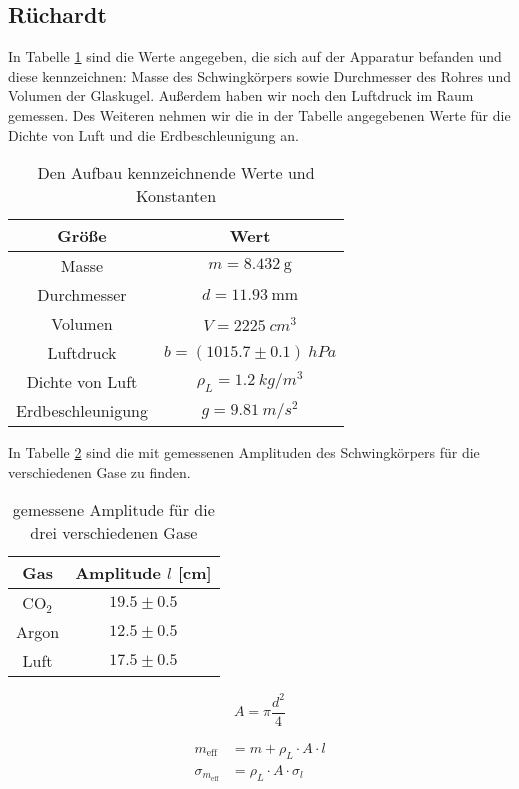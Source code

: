 \documentclass[12pt,a4paper,titlepage,headinclude,bibtotoc]{scrartcl}
\begin{document}
\subsection{Rüchardt}
In Tabelle \ref{tab:RuechardtWerte} sind die Werte angegeben, die sich auf der Apparatur befanden und diese kennzeichnen: Masse des Schwingkörpers sowie Durchmesser des Rohres und Volumen der Glaskugel.
Außerdem haben wir noch den Luftdruck im Raum gemessen.
Des Weiteren nehmen wir die in der Tabelle angegebenen Werte für die Dichte von Luft und die Erdbeschleunigung an.
\begin{table}[!htb]
	\centering
	\begin{tabular}{|c|c|}
		\hline
		Größe & Wert\\
		\hline
		\hline
		Masse & $m = 8.432~\si{\gram}$\\
		Durchmesser & $d = 11.93~\si{\milli\meter}$\\
		Volumen & $V = 2225~\si{cm^3}$\\
		\hline
		Luftdruck & $b = (1015.7 \pm 0.1)~\si{hPa}$\\ 		
		\hline
		Dichte von Luft & $\rho_L = 1.2~\si{kg/m^3}$\\
		Erdbeschleunigung & $g = 9.81~\si{m/s^2}$\\		
		\hline
	\end{tabular}
	\caption{Den Aufbau kennzeichnende Werte und Konstanten}
	\label{tab:RuechardtWerte}	
\end{table}
In Tabelle \ref{tab:RuechardtAmpl} sind die mit gemessenen Amplituden des Schwingkörpers für die verschiedenen Gase zu finden.
\begin{table}[!hbt]
	\centering
	\begin{tabular}{|c|c|}
		\hline
		Gas & Amplitude $l$ [cm]\\
		\hline
		\hline
		CO$_2$& $19.5\pm0.5$\\
		Argon & $12.5\pm0.5$\\
		Luft & $17.5\pm0.5$\\
		\hline
	\end{tabular}
	\caption{gemessene Amplitude für die drei verschiedenen Gase}
	\label{tab:RuechardtAmpl}
\end{table}

$$ A = \pi\frac{d^2}{4}$$

\begin{align}
	m_{\text{eff}}&= m + \rho_L \cdot A \cdot l\\
	\sigma_{m_\text{eff}}&=\rho_L \cdot A \cdot \sigma_l
\end{align}
\end{document}
